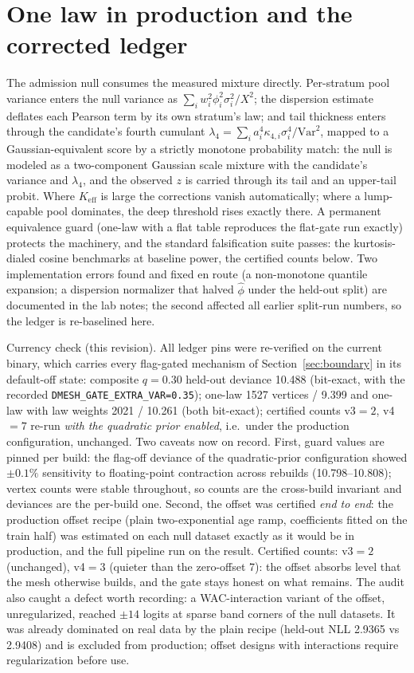 \documentclass[11pt]{article}
\begin{document}
\section{One law in production and the corrected ledger}\label{sec:onelaw}

The admission null consumes the measured mixture directly. Per-stratum
pool variance enters the null variance as
$\sum_i w_i^2\phi_i^2\sigma_i^2/X^2$; the dispersion estimate deflates
each Pearson term by its own stratum's law; and tail thickness enters
through the candidate's fourth cumulant
$\lambda_4 = \sum_i a_i^4\kappa_{4,i}\sigma_i^4/\mathrm{Var}^2$, mapped
to a Gaussian-equivalent score by a strictly monotone probability match:
the null is modeled as a two-component Gaussian scale mixture with the
candidate's variance and $\lambda_4$, and the observed $z$ is carried
through its tail and an upper-tail probit. Where $K_{\mathrm{eff}}$ is
large the corrections vanish automatically; where a lump-capable pool
dominates, the deep threshold rises exactly there. A permanent
equivalence guard (one-law with a flat table reproduces the flat-gate
run exactly) protects the machinery, and the standard falsification
suite passes: the kurtosis-dialed cosine benchmarks at baseline power,
the certified counts below. Two implementation errors found and fixed
en route (a non-monotone quantile expansion; a dispersion normalizer
that halved $\hat\phi$ under the held-out split) are documented in the
lab notes; the second affected all earlier split-run numbers, so the
ledger is re-baselined here.

Currency check (this revision). All ledger pins were re-verified on the
current binary, which carries every flag-gated mechanism of
Section~\ref{sec:boundary} in its default-off state: composite
$q{=}0.30$ held-out deviance 10.488 (bit-exact, with the recorded
\texttt{DMESH\_GATE\_EXTRA\_VAR=0.35}); one-law 1527 vertices / 9.399
and one-law with law weights 2021 / 10.261 (both bit-exact); certified
counts v3${}=2$, v4${}=7$ re-run \emph{with the quadratic prior
enabled}, i.e.\ under the production configuration, unchanged. Two
caveats now on record. First, guard values are pinned per build: the
flag-off deviance of the quadratic-prior configuration showed
$\pm 0.1\%$ sensitivity to floating-point contraction across rebuilds
(10.798--10.808); vertex counts were stable throughout, so counts are
the cross-build invariant and deviances are the per-build one. Second,
the offset was certified \emph{end to end}: the production offset
recipe (plain two-exponential age ramp, coefficients fitted on the
train half) was estimated on each null dataset exactly as it would be
in production, and the full pipeline run on the result. Certified
counts: v3${}=2$ (unchanged), v4${}=3$ (quieter than the zero-offset
7): the offset absorbs level that the mesh otherwise builds, and the
gate stays honest on what remains. The audit also caught a defect
worth recording: a WAC-interaction variant of the offset, unregularized,
reached $\pm14$ logits at sparse band corners of the null datasets. It
was already dominated on real data by the plain recipe (held-out NLL
2.9365 vs 2.9408) and is excluded from production; offset designs with
interactions require regularization before use.
\end{document}
